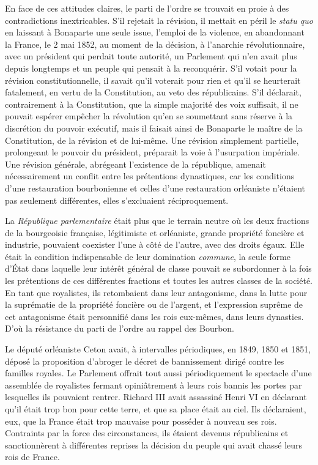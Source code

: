 \documentclass[french,twoside]{book} %
\begin{document}
En face de ces attitudes claires, le parti de l’ordre se trouvait en proie à des contradictions inextricables. S’il rejetait la révision, il mettait en péril le \emph{statu quo} en laissant à Bonaparte une seule issue, l’emploi de la violence, en abandonnant la France, le 2 mai 1852, au moment de la décision, à l’anarchie révolutionnaire, avec un président qui perdait toute autorité, un Parlement qui n’en avait plus depuis longtemps et un peuple qui pensait à la reconquérir. S’il votait pour la révision constitutionnelle, il savait qu’il voterait pour rien et qu’il se heurterait fatalement, en vertu de la Constitution, au veto des républicains. S’il déclarait, contrairement à la Constitution, que la simple majorité des voix suffisait, il ne pouvait espérer empêcher la révolution qu’en se soumettant sans réserve à la discrétion du pouvoir exécutif, mais il faisait ainsi de Bonaparte le maître de la Constitution, de la révision et de lui-même. Une révision simplement partielle, prolongeant le pouvoir du président, préparait la voie à l’usurpation impériale. Une révision générale, abrégeant l’existence de la république, amenait nécessairement un conflit entre les prétentions dynastiques, car les conditions d’une restauration bourbonienne et celles d’une restauration orléaniste n’étaient pas seulement différentes, elles s’excluaient réciproquement.\par
La \emph{République parlementaire} était plus que le terrain neutre où les deux fractions de la bourgeoisie française, légitimiste et orléaniste, grande propriété foncière et industrie, pouvaient coexister l’une à côté de l’autre, avec des droits égaux. Elle était la condition indispensable de leur domination \emph{commune}, la seule forme d’État dans laquelle leur intérêt général de classe pouvait se subordonner à la fois les prétentions de ces différentes fractions et toutes les autres classes de la société. En tant que royalistes, ils retombaient dans leur antagonisme, dans la lutte pour la suprématie de la propriété foncière ou de l’argent, et l’expression suprême de cet antagonisme était personnifié dans les rois eux-mêmes, dans leurs dynasties. D’où la résistance du parti de l’ordre au rappel des Bourbon.\par
Le député orléaniste Ceton avait, à intervalles périodiques, en 1849, 1850 et 1851, déposé la proposition d’abroger le décret de bannissement dirigé contre les familles royales. Le Parlement offrait tout aussi périodiquement le spectacle d’une assemblée de royalistes fermant opiniâtrement à leurs rois bannis les portes par lesquelles ils pouvaient rentrer. Richard III avait assassiné Henri VI en déclarant qu’il était trop bon pour cette terre, et que sa place était au ciel. Ils déclaraient, eux, que la France était trop mauvaise pour posséder à nouveau ses rois. Contraints par la force des circonstances, ils étaient devenus républicains et sanctionnèrent à différentes reprises la décision du peuple qui avait chassé leurs rois de France.\par
\end{document}
